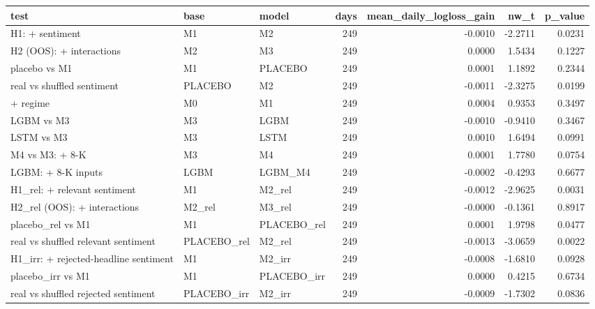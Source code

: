 \begin{tabular}{lllrrrr}
\toprule
test & base & model & days & mean\_daily\_logloss\_gain & nw\_t & p\_value \\
\midrule
H1: + sentiment & M1 & M2 & 249 & -0.0010 & -2.2711 & 0.0231 \\
H2 (OOS): + interactions & M2 & M3 & 249 & 0.0000 & 1.5434 & 0.1227 \\
placebo vs M1 & M1 & PLACEBO & 249 & 0.0001 & 1.1892 & 0.2344 \\
real vs shuffled sentiment & PLACEBO & M2 & 249 & -0.0011 & -2.3275 & 0.0199 \\
+ regime & M0 & M1 & 249 & 0.0004 & 0.9353 & 0.3497 \\
LGBM vs M3 & M3 & LGBM & 249 & -0.0010 & -0.9410 & 0.3467 \\
LSTM vs M3 & M3 & LSTM & 249 & 0.0010 & 1.6494 & 0.0991 \\
M4 vs M3: + 8-K & M3 & M4 & 249 & 0.0001 & 1.7780 & 0.0754 \\
LGBM: + 8-K inputs & LGBM & LGBM\_M4 & 249 & -0.0002 & -0.4293 & 0.6677 \\
H1\_rel: + relevant sentiment & M1 & M2\_rel & 249 & -0.0012 & -2.9625 & 0.0031 \\
H2\_rel (OOS): + interactions & M2\_rel & M3\_rel & 249 & -0.0000 & -0.1361 & 0.8917 \\
placebo\_rel vs M1 & M1 & PLACEBO\_rel & 249 & 0.0001 & 1.9798 & 0.0477 \\
real vs shuffled relevant sentiment & PLACEBO\_rel & M2\_rel & 249 & -0.0013 & -3.0659 & 0.0022 \\
H1\_irr: + rejected-headline sentiment & M1 & M2\_irr & 249 & -0.0008 & -1.6810 & 0.0928 \\
placebo\_irr vs M1 & M1 & PLACEBO\_irr & 249 & 0.0000 & 0.4215 & 0.6734 \\
real vs shuffled rejected sentiment & PLACEBO\_irr & M2\_irr & 249 & -0.0009 & -1.7302 & 0.0836 \\
\bottomrule
\end{tabular}
